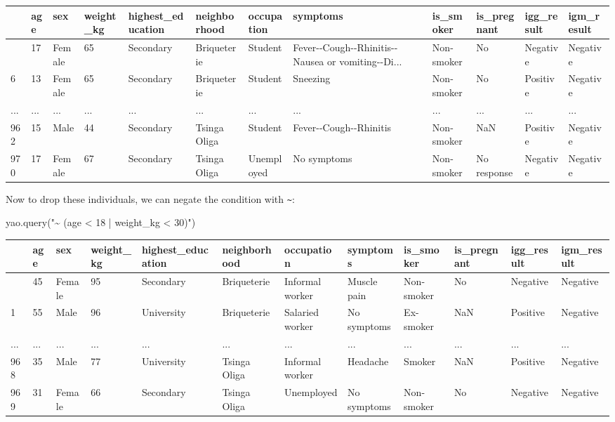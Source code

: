 \documentclass[
  letterpaper,
  DIV=11,
  numbers=noendperiod]{scrreprt}
\newenvironment{Shaded}{\begin{snugshade}}{\end{snugshade}}
\newcommand{\NormalTok}[1]{\textcolor[rgb]{0.00,0.23,0.31}{#1}}
\newcommand{\StringTok}[1]{\textcolor[rgb]{0.13,0.47,0.30}{#1}}
\begin{document}
\begin{longtable}[]{@{}llllllllllll@{}}
\toprule\noalign{}
& age & sex & weight\_kg & highest\_education & neighborhood &
occupation & symptoms & is\_smoker & is\_pregnant & igg\_result &
igm\_result \\
\midrule\noalign{}
\endhead
\bottomrule\noalign{}
\endlastfoot
5 & 17 & Female & 65 & Secondary & Briqueterie & Student &
Fever-\/-Cough-\/-Rhinitis-\/-Nausea or vomiting-\/-Di... & Non-smoker &
No & Negative & Negative \\
6 & 13 & Female & 65 & Secondary & Briqueterie & Student & Sneezing &
Non-smoker & No & Positive & Negative \\
... & ... & ... & ... & ... & ... & ... & ... & ... & ... & ... & ... \\
962 & 15 & Male & 44 & Secondary & Tsinga Oliga & Student &
Fever-\/-Cough-\/-Rhinitis & Non-smoker & NaN & Positive & Negative \\
970 & 17 & Female & 67 & Secondary & Tsinga Oliga & Unemployed & No
symptoms & Non-smoker & No response & Negative & Negative \\
\end{longtable}

Now to drop these individuals, we can negate the condition with
\texttt{\textasciitilde{}}:

\begin{Shaded}
\begin{Highlighting}[]
\NormalTok{yao.query(}\StringTok{"\textasciitilde{} (age \textless{} 18 | weight\_kg \textless{} 30)"}\NormalTok{)}
\end{Highlighting}
\end{Shaded}

\begin{longtable}[]{@{}llllllllllll@{}}
\toprule\noalign{}
& age & sex & weight\_kg & highest\_education & neighborhood &
occupation & symptoms & is\_smoker & is\_pregnant & igg\_result &
igm\_result \\
\midrule\noalign{}
\endhead
\bottomrule\noalign{}
\endlastfoot
0 & 45 & Female & 95 & Secondary & Briqueterie & Informal worker &
Muscle pain & Non-smoker & No & Negative & Negative \\
1 & 55 & Male & 96 & University & Briqueterie & Salaried worker & No
symptoms & Ex-smoker & NaN & Positive & Negative \\
... & ... & ... & ... & ... & ... & ... & ... & ... & ... & ... & ... \\
968 & 35 & Male & 77 & University & Tsinga Oliga & Informal worker &
Headache & Smoker & NaN & Positive & Negative \\
969 & 31 & Female & 66 & Secondary & Tsinga Oliga & Unemployed & No
symptoms & Non-smoker & No & Negative & Negative \\
\end{longtable}
\end{document}
